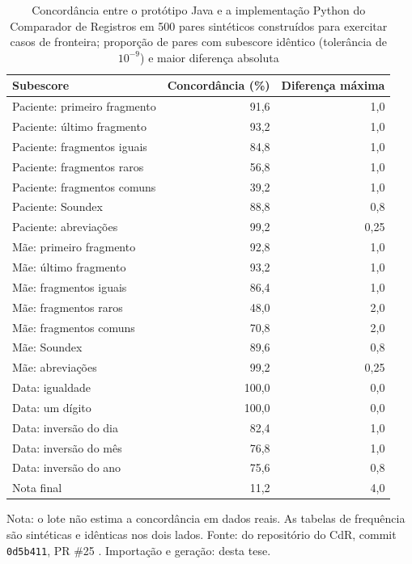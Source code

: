 \begin{table}[htbp]
\centering
\footnotesize
\caption{Concordância entre o protótipo Java e a implementação Python do Comparador de Registros em 500 pares sintéticos construídos para exercitar casos de fronteira; proporção de pares com subescore idêntico (tolerância de $10^{-9}$) e maior diferença absoluta}
\label{tab:equivalencia-java}
\begin{tabular}{lrr}
\toprule
Subescore & Concordância (\%) & Diferença máxima \\
\midrule
Paciente: primeiro fragmento & 91,6 & 1,0 \\
Paciente: último fragmento & 93,2 & 1,0 \\
Paciente: fragmentos iguais & 84,8 & 1,0 \\
Paciente: fragmentos raros & 56,8 & 1,0 \\
Paciente: fragmentos comuns & 39,2 & 1,0 \\
Paciente: Soundex & 88,8 & 0,8 \\
Paciente: abreviações & 99,2 & 0,25 \\
Mãe: primeiro fragmento & 92,8 & 1,0 \\
Mãe: último fragmento & 93,2 & 1,0 \\
Mãe: fragmentos iguais & 86,4 & 1,0 \\
Mãe: fragmentos raros & 48,0 & 2,0 \\
Mãe: fragmentos comuns & 70,8 & 2,0 \\
Mãe: Soundex & 89,6 & 0,8 \\
Mãe: abreviações & 99,2 & 0,25 \\
\midrule
Data: igualdade & 100,0 & 0,0 \\
Data: um dígito & 100,0 & 0,0 \\
Data: inversão do dia & 82,4 & 1,0 \\
Data: inversão do mês & 76,8 & 1,0 \\
Data: inversão do ano & 75,6 & 0,8 \\
\midrule
Nota final & 11,2 & 4,0 \\
\bottomrule
\end{tabular}
\par\smallskip
\begin{minipage}{\textwidth}
\footnotesize Nota: o lote não estima a concordância em dados reais. As tabelas de frequência são sintéticas e idênticas nos dois lados. Fonte:  do repositório do CdR, commit \texttt{0d5b411}, PR \#25 \cite{Jardim2025comparador}. Importação e geração:  desta tese.
\end{minipage}
\end{table}
